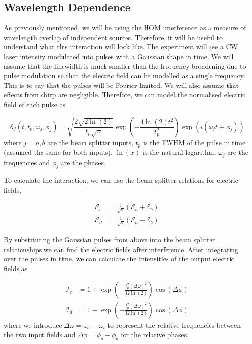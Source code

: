 \subsection{Wavelength Dependence}

As previously mentioned, we will be using the \ac{HOM} interference as a measure of wavelength overlap of independent sources. Therefore, it will be useful to understand what this interaction will look like. The experiment will see a \ac{CW} laser intensity modulated into pulses with a Gaussian shape in time. We will assume that the linewidth is much smaller than the frequency broadening due to pulse modulation so that the electric field can be modelled as a single frequency. This is to say that the pulses will be Fourier limited. We will also assume that effects from chirp are negligible. Therefore, we can model the normalised electric field of each pulse as

\begin{equation}
	\mathcal{E}_j(t, t_p, \omega_j, \phi_j) = \sqrt{\frac{2 \sqrt{2\ln(2)}}{t_p\sqrt{\pi}}} \exp{\left(-\frac{4 \ln(2) t^2}{t_p^2}\right)} \exp{\left(i(\omega_j t + \phi_j)\right)}
\end{equation}
where $j = a,b$ are the beam splitter inputs, $t_p$ is the \ac{FWHM} of the pulse in time (assumed the same for both inputs), $\ln(x)$ is the natural logarithm, $\omega_j$ are the frequencies and $\phi_j$ are the phases. 

To calculate the interaction, we can use the beam splitter relations for electric fields,

\begin{align}
	\mathcal{E}_c &= \frac{1}{\sqrt{2}}\left(\mathcal{E}_a + \mathcal{E}_b \right)\\
	\mathcal{E}_d &= \frac{1}{\sqrt{2}}\left(\mathcal{E}_a - \mathcal{E}_b \right)
\end{align}

By substituting the Gaussian pulses from above into the beam splitter relationships we can find the electric fields after interference. After integrating over the pulses in time, we can calculate the intensities of the output electric fields as

\begin{align}
	\mathcal{I}_c &= 1 + \exp\left(-\frac{t_p^2(\Delta\omega)^2}{32\ln(2)}\right)\cos(\Delta\phi)\\
	\mathcal{I}_d &= 1 - \exp\left(-\frac{t_p^2(\Delta\omega)^2}{32\ln(2)}\right)\cos(\Delta\phi)
\end{align}
where we introduce $\Delta\omega = \omega_a - \omega_b$ to represent the relative frequencies between the two input fields and $\Delta\phi = \phi_a - \phi_b$ for the relative phases. 

